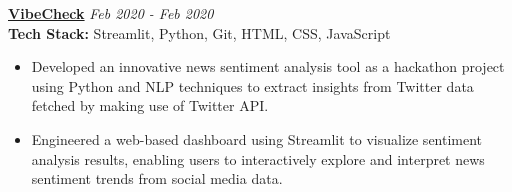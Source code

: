 \documentclass[10pt, letterpaper]{article}
\begin{document}



\vspace{0.2cm}

\textbf{\href{https://github.com/yash-mandaviya/VibeCheck}{VibeCheck}} \hfill \textit{Feb 2020 - Feb 2020} \\
\textbf{Tech Stack:}  Streamlit, Python, Git, HTML, CSS, JavaScript \\
\begin{itemize}
\vspace{-0.3cm}
    \item Developed an innovative news sentiment analysis tool as a hackathon project using Python and NLP techniques to extract insights from Twitter data fetched by making use of Twitter API.
    \item Engineered a web-based dashboard using Streamlit to visualize sentiment analysis results, enabling users to interactively explore and interpret news sentiment trends from social media data.
\end{itemize}
\end{document}
